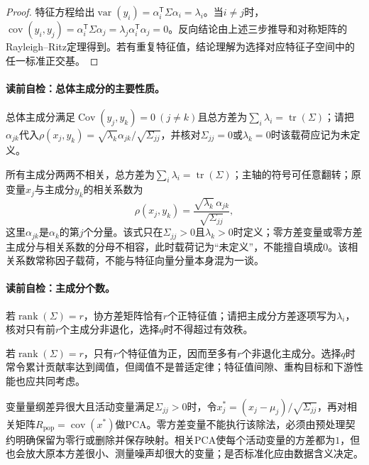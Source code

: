 \begin{proof}
特征方程给出$\operatorname{var}(y_i)=\alpha_i^{\mathsf T}\Sigma\alpha_i=\lambda_i$。当$i\ne j$时，
$\operatorname{cov}(y_i,y_j)=\alpha_i^{\mathsf T}\Sigma\alpha_j=\lambda_j\alpha_i^{\mathsf T}\alpha_j=0$。反向结论由上述三步推导和对称矩阵的Rayleigh--Ritz定理得到。若有重复特征值，结论理解为选择对应特征子空间中的任一标准正交基。
\end{proof}

\paragraph{读前自检：总体主成分的主要性质。}总体主成分满足$\operatorname{Cov}(y_j,y_k)=0\ (j\ne k)$且总方差为$\sum_i\lambda_i=\operatorname{tr}(\Sigma)$；请把$\alpha_{jk}$代入$\rho(x_j,y_k)=\sqrt{\lambda_k}\alpha_{jk}/\sqrt{\Sigma_{jj}}$，并核对$\Sigma_{jj}=0$或$\lambda_k=0$时该载荷应记为未定义。\par

所有主成分两两不相关，总方差为$\sum_i\lambda_i=\operatorname{tr}(\Sigma)$；主轴的符号可任意翻转；原变量$x_j$与主成分$y_k$的相关系数为
\[
\rho(x_j,y_k)=\frac{\sqrt{\lambda_k}\,\alpha_{jk}}{\sqrt{\Sigma_{jj}}},
\]
这里$\alpha_{jk}$是$\alpha_k$的第$j$个分量。该式只在$\Sigma_{jj}>0$且$\lambda_k>0$时定义；零方差变量或零方差主成分与相关系数的分母不相容，此时载荷记为“未定义”，不能擅自填成0。该相关系数常称因子载荷，不能与特征向量分量本身混为一谈。

\paragraph{读前自检：主成分个数。}若$\operatorname{rank}(\Sigma)=r$，协方差矩阵恰有$r$个正特征值；请把主成分方差逐项写为$\lambda_i$，核对只有前$r$个主成分非退化，选择$q$时不得超过有效秩。\par

若$\operatorname{rank}(\Sigma)=r$，只有$r$个特征值为正，因而至多有$r$个非退化主成分。选择$q$时常令累计贡献率达到阈值，但阈值不是普适定律；特征值间隙、重构目标和下游性能也应共同考虑。

变量量纲差异很大且活动变量满足$\Sigma_{jj}>0$时，令$x_j^*=(x_j-\mu_j)/\sqrt{\Sigma_{jj}}$，再对相关矩阵$R_{\mathrm{pop}}=\operatorname{cov}(x^*)$做PCA。零方差变量不能执行该除法，必须由预处理契约明确保留为零行或删除并保存映射。相关PCA使每个活动变量的方差都为$1$，但也会放大原本方差很小、测量噪声却很大的变量；是否标准化应由数据含义决定。

